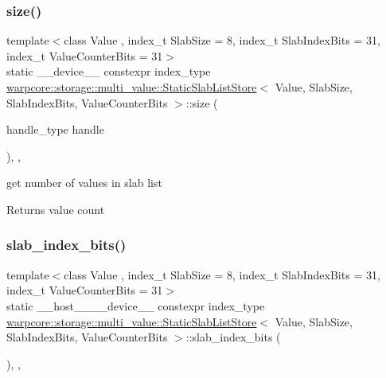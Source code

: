 \subsubsection{\texorpdfstring{size()}{size()}}
{\footnotesize\ttfamily template$<$class Value , index\+\_\+t Slab\+Size = 8, index\+\_\+t Slab\+Index\+Bits = 31, index\+\_\+t Value\+Counter\+Bits = 31$>$ \\
static \+\_\+\+\_\+device\+\_\+\+\_\+ constexpr index\+\_\+type \hyperlink{classwarpcore_1_1storage_1_1multi__value_1_1StaticSlabListStore}{warpcore\+::storage\+::multi\+\_\+value\+::\+Static\+Slab\+List\+Store}$<$ Value, Slab\+Size, Slab\+Index\+Bits, Value\+Counter\+Bits $>$\+::size (\begin{DoxyParamCaption}\item[{handle\+\_\+type}]{handle }\end{DoxyParamCaption})\hspace{0.3cm}{\ttfamily [inline]}, {\ttfamily [static]}, {\ttfamily [noexcept]}}



get number of values in slab list 

\begin{DoxyReturn}{Returns}
value count 
\end{DoxyReturn}
\mbox{\label{classwarpcore_1_1storage_1_1multi__value_1_1StaticSlabListStore_a6a5d21c7ea19471f5ef36e18bb2543c7}} 
\subsubsection{\texorpdfstring{slab\+\_\+index\+\_\+bits()}{slab\_index\_bits()}}
{\footnotesize\ttfamily template$<$class Value , index\+\_\+t Slab\+Size = 8, index\+\_\+t Slab\+Index\+Bits = 31, index\+\_\+t Value\+Counter\+Bits = 31$>$ \\
static \+\_\+\+\_\+host\+\_\+\+\_\+\+\_\+\+\_\+device\+\_\+\+\_\+ constexpr index\+\_\+type \hyperlink{classwarpcore_1_1storage_1_1multi__value_1_1StaticSlabListStore}{warpcore\+::storage\+::multi\+\_\+value\+::\+Static\+Slab\+List\+Store}$<$ Value, Slab\+Size, Slab\+Index\+Bits, Value\+Counter\+Bits $>$\+::slab\+\_\+index\+\_\+bits (\begin{DoxyParamCaption}{ }\end{DoxyParamCaption})\hspace{0.3cm}{\ttfamily [inline]}, {\ttfamily [static]}, {\ttfamily [noexcept]}}



